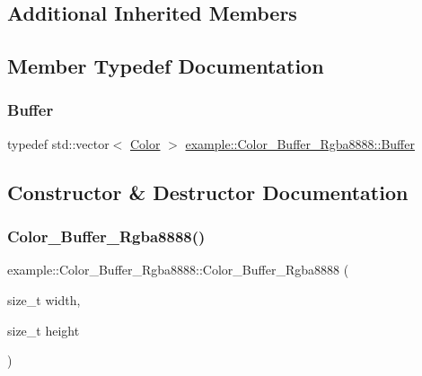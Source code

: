 \subsection*{Additional Inherited Members}


\subsection{Member Typedef Documentation}
\mbox{\label{classexample_1_1_color___buffer___rgba8888_ac6bfcddbbeeb02961b8724d9f5e10033}} 
\subsubsection{\texorpdfstring{Buffer}{Buffer}}
{\footnotesize\ttfamily typedef std\+::vector$<$ \mbox{\hyperlink{structexample_1_1_color___buffer___rgba8888_1_1_color}{Color}} $>$ \mbox{\hyperlink{classexample_1_1_color___buffer___rgba8888_ac6bfcddbbeeb02961b8724d9f5e10033}{example\+::\+Color\+\_\+\+Buffer\+\_\+\+Rgba8888\+::\+Buffer}}}



\subsection{Constructor \& Destructor Documentation}
\mbox{\label{classexample_1_1_color___buffer___rgba8888_aa5397ac3ceb62d95d0f4773205d98177}} 
\subsubsection{\texorpdfstring{Color\_Buffer\_Rgba8888()}{Color\_Buffer\_Rgba8888()}}
{\footnotesize\ttfamily example\+::\+Color\+\_\+\+Buffer\+\_\+\+Rgba8888\+::\+Color\+\_\+\+Buffer\+\_\+\+Rgba8888 (\begin{DoxyParamCaption}\item[{size\+\_\+t}]{width,  }\item[{size\+\_\+t}]{height }\end{DoxyParamCaption})\hspace{0.3cm}{\ttfamily [inline]}}



